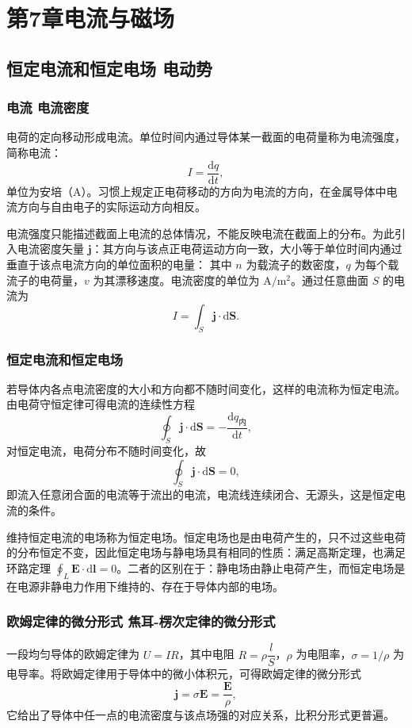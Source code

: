 \chapter{第7章\texorpdfstring{\hspace{0.5em}}{ }电流与磁场}

\section{恒定电流和恒定电场 电动势}
    \subsection{电流 电流密度}
    电荷的定向移动形成电流。单位时间内通过导体某一截面的电荷量称为电流强度，简称电流：
    \[
    I=\frac{\mathrm{d}q}{\mathrm{d}t},
    \]
    单位为安培（$\mathrm{A}$）。习惯上规定正电荷移动的方向为电流的方向，在金属导体中电流方向与自由电子的实际运动方向相反。

    电流强度只能描述截面上电流的总体情况，不能反映电流在截面上的分布。为此引入电流密度矢量 $\boldsymbol{j}$：其方向与该点正电荷运动方向一致，大小等于单位时间内通过垂直于该点电流方向的单位面积的电量：
    其中 $n$ 为载流子的数密度，$q$ 为每个载流子的电荷量，$v$ 为其漂移速度。电流密度的单位为 $\mathrm{A/m^{2}}$。通过任意曲面 $S$ 的电流为
    \[
    I=\int_S\boldsymbol{j}\cdot\mathrm{d}\boldsymbol{S}.
    \]

    \subsection{恒定电流和恒定电场}
    若导体内各点电流密度的大小和方向都不随时间变化，这样的电流称为恒定电流。由电荷守恒定律可得电流的连续性方程
    \[
    \oint_S\boldsymbol{j}\cdot\mathrm{d}\boldsymbol{S}=-\frac{\mathrm{d}q_{\text{内}}}{\mathrm{d}t},
    \]
    对恒定电流，电荷分布不随时间变化，故
    \[
    \oint_S\boldsymbol{j}\cdot\mathrm{d}\boldsymbol{S}=0,
    \]
    即流入任意闭合面的电流等于流出的电流，电流线连续闭合、无源头，这是恒定电流的条件。

    维持恒定电流的电场称为恒定电场。恒定电场也是由电荷产生的，只不过这些电荷的分布恒定不变，因此恒定电场与静电场具有相同的性质：满足高斯定理，也满足环路定理 $\oint_L\boldsymbol{E}\cdot\mathrm{d}\boldsymbol{l}=0$。二者的区别在于：静电场由静止电荷产生，而恒定电场是在电源非静电力作用下维持的、存在于导体内部的电场。

    \subsection{欧姆定律的微分形式 焦耳-楞次定律的微分形式}
    一段均匀导体的欧姆定律为 $U=IR$，其中电阻 $R=\rho\dfrac{l}{S}$，$\rho$ 为电阻率，$\sigma=1/\rho$ 为电导率。将欧姆定律用于导体中的微小体积元，可得欧姆定律的微分形式
    \[
    \boldsymbol{j}=\sigma\boldsymbol{E}=\frac{\boldsymbol{E}}{\rho},
    \]
    它给出了导体中任一点的电流密度与该点场强的对应关系，比积分形式更普遍。


